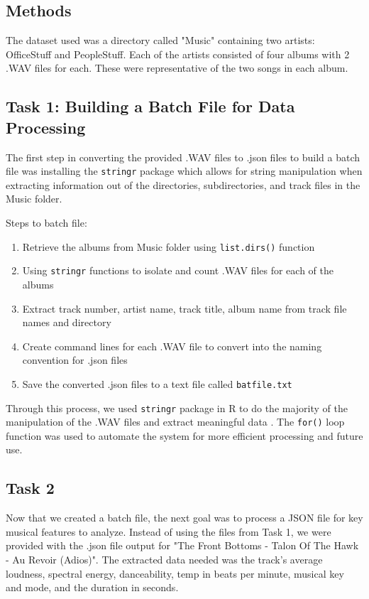 \documentclass{article}\usepackage[]{graphicx}\usepackage[]{xcolor}
\begin{document}
\begin{multicols}{2}
\section{Methods}

The dataset used was a directory called "Music" containing two artists: OfficeStuff and PeopleStuff. Each of the artists consisted of four albums with 2 .WAV files for each. These were representative of the two songs in each album. 

\subsection{Task 1: Building a Batch File for Data Processing}

The first step in converting the provided .WAV files to .json files to build a batch file was installing the \texttt{stringr} package which allows for string manipulation when extracting information out of the directories, subdirectories, and track files in the Music folder. 

Steps to batch file:
\begin{enumerate}
  \item Retrieve the albums from Music folder using \texttt{list.dirs()} function
  \item Using \texttt{stringr} functions to isolate and count .WAV files for each of the albums
  \item Extract track number, artist name, track title, album name from track file names and directory
  \item Create command lines for each .WAV file to convert into the naming convention for .json files
  \item Save the converted .json files to a text file called \texttt{batfile.txt}
\end{enumerate}
Through this process, we used \texttt{stringr} package in R to do the majority of the manipulation of the .WAV files and extract meaningful data \citep{Wickham}. The \texttt{for()} loop function was used to automate the system for more efficient processing and future use.

\subsection{Task 2}

Now that we created a batch file, the next goal was to process a JSON file for key musical features to analyze. Instead of using the files from Task 1, we were provided with the .json file output for "The Front Bottoms - Talon Of The Hawk - Au Revoir (Adios)". The extracted data needed was the track's average loudness, spectral energy, danceability, temp in beats per minute, musical key and mode, and the duration in seconds.


\end{multicols}
\end{document}
